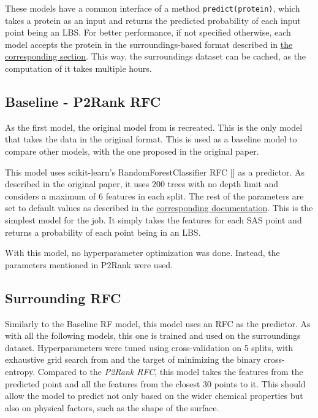 These models have a common interface of a method \texttt{predict(protein)}, which takes a protein as an input and returns the predicted probability of each input point being an \ac{LBS}. For better performance, if not specified otherwise, each model accepts the protein in the surroundings-based format described in \hyperref[Surroundings]{the corresponding section}. This way, the surroundings dataset can be cached, as the computation of it takes multiple hours.

\subsection{Baseline - P2Rank RFC}
As the first model, the original model from \cite{P2RANK} is recreated. This is the only model that takes the data in the original format. This is used as a baseline model to compare other models, with the one proposed in the original paper.

This model uses scikit-learn's RandomForestClassifier \ac{RFC} [\cite{scikit-learn}] as a predictor. As described in the original paper, it uses 200 trees with no depth limit and considers a maximum of 6 features in each split. The rest of the parameters are set to default values as described in the \hyperlink{https://scikit-learn.org/1.1/modules/generated/sklearn.ensemble.RandomForestClassifier.html}{corresponding documentation}. This is the simplest model for the job. It simply takes the features for each \ac{SAS} point and returns a probability of each point being in an \ac{LBS}.

With this model, no hyperparameter optimization was done. Instead, the parameters mentioned in P2Rank were used.

\subsection{Surrounding RFC}

Similarly to the Baseline RF model, this model uses an \ac{RFC} as the predictor. As with all the following models, this one is trained and used on the surroundings dataset. Hyperparameters were tuned using cross-validation on 5 splits, with exhaustive grid search from \cite{scikit-learn} and the target of minimizing the binary cross-entropy. Compared to the \textit{P2Rank RFC}, this model takes the features from the predicted point and all the features from the closest 30 points to it. This should allow the model to predict not only based on the wider chemical properties but also on physical factors, such as the shape of the surface. 

